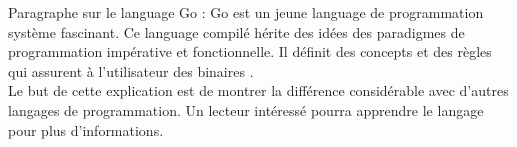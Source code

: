        


        Paragraphe sur le language Go : 
        Go est un jeune language de programmation système
        fascinant. Ce language compilé hérite des idées des paradigmes de
        programmation impérative et fonctionnelle. Il définit des concepts et
        des règles qui assurent à l'utilisateur des binaires .\\[0.3cm]
       
      
        Le but de cette explication est de montrer la différence considérable
        avec d'autres langages de programmation. Un lecteur intéressé pourra
        apprendre le langage pour plus d'informations.

